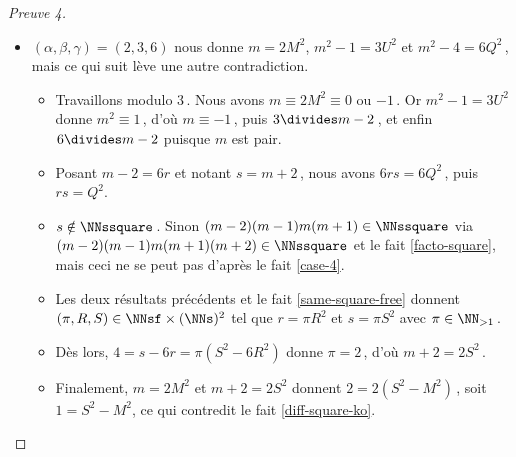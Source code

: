 \begin{proof}[Preuve 4]
\begin{itemize}
		\item $(\alpha, \beta, \gamma) = (2, 3, 6)$ nous donne $m = 2 M^2$, $m^2 - 1 = 3 U^2$ et $m^2 - 4 = 6 Q^2$\,, mais ce qui suit lève une autre contradiction.
		\begin{itemize}
			\item Travaillons modulo $3$\,.
			Nous avons $m \equiv 2 M^2 \equiv \text{$0$ ou $-1$}$\,. 
			Or $m^2 - 1 = 3 U^2$ donne $m^2 \equiv 1$\,, d'où $m \equiv -1$\,, puis $3 \divides m - 2$\,, et enfin $6 \divides m - 2$ puisque $m$ est pair.
			
			\item Posant $m - 2 = 6 r$ et notant $s = m + 2$\,, nous avons $6 r s = 6 Q^2$\,, puis $r s = Q^2$.
			
			\item $s \notin \NNssquare$\,. Sinon $(m-2)(m-1)m(m+1) \in \NNssquare$ via $(m-2)(m-1)m(m+1)(m+2)  \in \NNssquare$ et le fait \ref{facto-square}, mais ceci ne se peut pas d'après le fait \ref{case-4}.
			
			\item Les deux résultats précédents et le fait \ref{same-square-free} donnent $(\pi, R, S) \in \NNsf \times ( \NNs )^2$ tel que $r = \pi R^2$ et $s = \pi S^2$ avec  $\pi \in \NN_{>1}$\,.
			
			\item Dès lors, $4 = s - 6r = \pi (S^2 - 6 R^2)$ donne $\pi = 2$\,, d'où $m + 2 = 2 S^2$\,.
			
			\item Finalement, $m = 2 M^2$ et $m + 2 = 2 S^2$ donnent $2 = 2(S^2 - M^2)$\,, soit $1 = S^2 - M^2$, ce qui contredit le fait \ref{diff-square-ko}.
			\qedhere
		\end{itemize}
	\end{itemize}
\end{proof}

